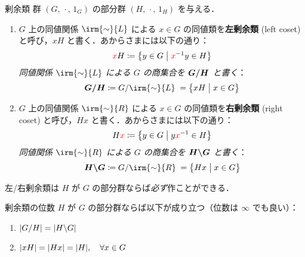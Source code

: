 \documentclass[geometry_main]{subfiles}
\begin{document}
\begin{mydef}[label=def.class_residue]{剰余類}
	群 $(G,\, \cdot\mathrel{},\, 1_G)$ の部分群 $(H,\, \cdot\mathrel{},\, 1_H)$ を与える．
	\begin{enumerate}
		\item  $G$ 上の同値関係 $\irm{\mathord{\sim}}{L}$ による $x \in G$ の同値類を\textbf{左剰余類} (left coset) と呼び，$xH$ と書く．あからさまには以下の通り：
		\begin{align}
			\textcolor{red}{x}H \coloneqq \bigl\{ y \in G \bigm| \textcolor{red}{x}^{-1}y \in H \bigr\} 
		\end{align}
		\emph{同値関係 $\irm{\mathord{\sim}}{L}$ による $G$ の商集合を $\vb*{G/H}$ と書く}：
		\begin{align}
			\vb*{G/H} \coloneqq G/\irm{\mathord{\sim}}{L}\; = \bigl\{ xH \bigm| x \in G \bigr\} 
		\end{align}
		\item  $G$ 上の同値関係 $\irm{\mathord{\sim}}{R}$ による $x \in G$ の同値類を\textbf{右剰余類} (right coset) と呼び，$Hx$ と書く．あからさまには以下の通り：
		\begin{align}
			H\textcolor{red}{x} \coloneqq \bigl\{ y \in G \bigm| y\textcolor{red}{x}^{-1} \in H \bigr\} 
		\end{align}
		\emph{同値関係 $\irm{\mathord{\sim}}{R}$ による $G$ の商集合を $\vb*{H \backslash G}$ と書く}：
		\begin{align}
			\vb*{H \backslash G} \coloneqq G/\irm{\mathord{\sim}}{R}\; = \bigl\{ Hx \bigm| x \in G \bigr\} 
		\end{align}
	\end{enumerate}
\end{mydef}
左/右剰余類は $H$ が $G$ の部分群ならば\emph{必ず}作ことができる．

\begin{myprop}[label=prop.class_residual-1]{剰余類の位数}
	$H$ が $G$ の部分群ならば以下が成り立つ（位数は $\infty$ でも良い）：
	\begin{enumerate}
		\item $\abs{G/H} = \abs{H \backslash G}$
		\item $\abs{xH} = \abs{Hx} = \abs{H},\quad \forall  x \in G$
	\end{enumerate}
\end{myprop}
\end{document}
